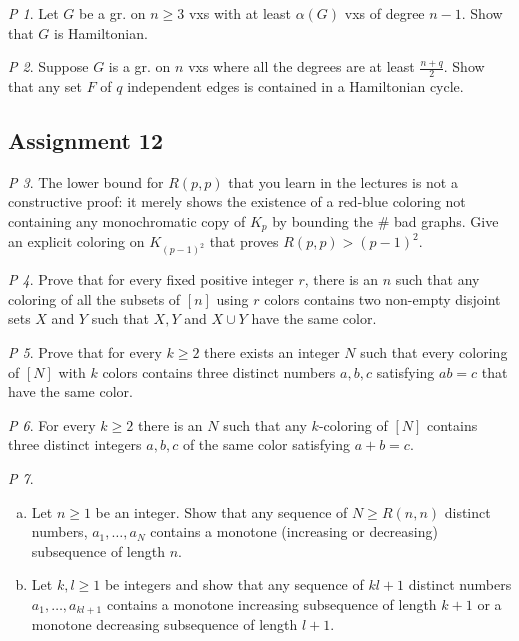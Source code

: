 \documentclass[11pt, fleqn, a4paper, landscape]{article}
\theoremstyle{plain} %
\theoremstyle{remark} %
\newtheorem{problem}{P}
\theoremstyle{definition} %
\begin{document}
\begin{multicols}{5}
\begin{problem}
Let $G$ be a gr. on $n \ge 3$ vxs with at least $\alpha(G)$ vxs of degree $n- 1$. Show that $G$ is Hamiltonian.
\end{problem}

\begin{problem}
Suppose $G$ is a gr. on $n$ vxs where all the degrees are at least $\frac{n+q}{2}$. Show that any set $F$ of $q$ independent edges is contained in a Hamiltonian cycle.
\end{problem}

\subsection{Assignment 12}

\begin{problem}
The lower bound for $R(p, p)$ that you learn in the lectures is not a constructive proof: it merely shows the existence of a red-blue coloring not containing any monochromatic copy of $K_p$ by bounding the \# bad graphs. Give an explicit coloring on $K_{(p-1)^2}$ that proves $R(p, p) > (p - 1)^2$.
\end{problem}

\begin{problem}
Prove that for every fixed positive integer $r$, there is an $n$ such that any coloring of all the subsets of $[n] $ using $r$ colors contains two non-empty disjoint sets $X$ and $Y$ such that $X, Y $ and $X \cup Y$ have the same color.
\end{problem}

\begin{problem}
Prove that for every $k \ge 2$ there exists an integer $N$ such that every coloring of $[N]$ with $k$ colors contains three distinct numbers $a, b, c$ satisfying $ab = c$ that have the same color.
\end{problem}

\begin{problem}
For every $k\ge 2$ there is an $N$ such that any $k$-coloring of $[N]$ contains three distinct integers $a, b, c$ of the same color satisfying $a + b = c.$
\end{problem}

\begin{problem}
\begin{enumerate}[(a)]
\item Let $n\ge 1$ be an integer. Show that any sequence of $N\ge R(n, n)$  distinct numbers, $a_1,\dots, a_N$ contains a monotone (increasing or decreasing) subsequence of length $n$.
\item Let $k, l \ge1$ be integers and show that any sequence of $kl+1$ distinct numbers $a_1,\dots, a_{kl+1}$ contains a monotone increasing subsequence of length $k + 1$ or a monotone decreasing
subsequence of length $l + 1$.
\end{enumerate}
\end{problem}


\end{multicols}
\end{document}
